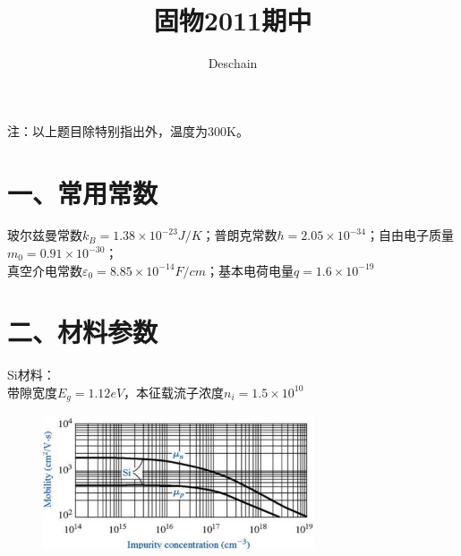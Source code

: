 \documentclass[UTF8]{ctexart}
\title{固物2011期中}
\author{Deschain}
\begin{document}
\maketitle
注：以上题目除特别指出外，温度为300K。
\section{一、常用常数}
玻尔兹曼常数$k_B=1.38\times10^{-23}J/K$；普朗克常数$\hbar=2.05\times10^{-34}$；自由电子质量$m_0=0.91\times10^{-30}$；\\
真空介电常数$\varepsilon_0=8.85\times10^{-14}F/cm$；基本电荷电量$q=1.6\times10^{-19}$\\
\section*{二、材料参数}
Si材料：\\
带隙宽度$E_g=1.12eV$，本征载流子浓度$n_i=1.5\times10^{10}$\\
\begin{figure}[H]
    \centering
    \includegraphics[width=8cm,height=4cm]{Si.png}
 \end{figure}
\end{document}
